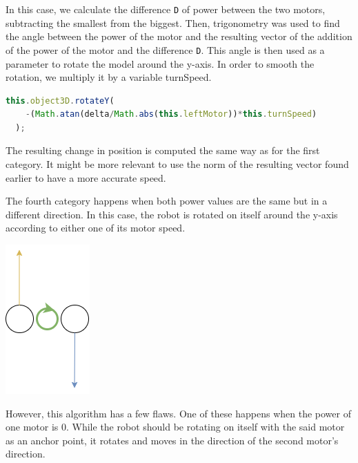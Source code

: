 \documentclass{scrreprt}
\begin{document}
In this case, we calculate the difference \texttt{D} of power between the two motors, subtracting the smallest from the biggest. Then, trigonometry was used to find the angle between the power of the motor and the resulting vector of the addition of the power of the motor and the difference \texttt{D}.
This angle is then used as a parameter to rotate the model around the y-axis. In order to smooth the rotation, we multiply it by a variable turnSpeed.  

\begin{lstlisting}[language=JavaScript, gobble=2, basicstyle=\ttfamily\small]
  this.object3D.rotateY(
    -(Math.atan(delta/Math.abs(this.leftMotor))*this.turnSpeed)
  );
\end{lstlisting} 

The resulting change in position is computed the same way as for the first category. It might be more relevant to use the norm of the resulting vector 
found earlier to have a more accurate speed.

The fourth category happens when both power values are the same but in a different direction. In this case, the robot is rotated on itself around the y-axis according to either one of its motor speed.

\begin{center}
  \includegraphics[scale=1]{./move_spdd}
\end{center}

However, this algorithm has a few flaws. One of these happens when the power of one motor is 0. While the robot should be rotating on itself with the said motor as an anchor point, it rotates and moves in the direction of the second motor's direction.
\end{document}
